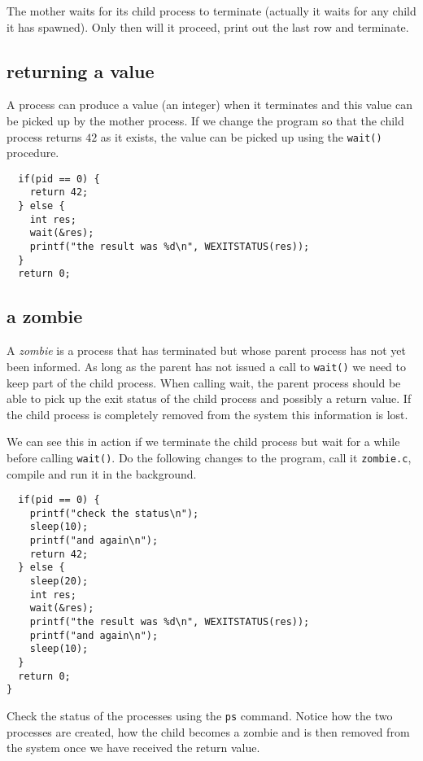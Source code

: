 \documentclass[a4paper,11pt]{article}
\begin{document}
The mother waits for its child process to terminate (actually it waits
for any child it has spawned). Only then will it proceed, print out
the last row and terminate.

\subsection{returning a value}

A process can produce a value (an integer) when it terminates and this
value can be picked up by the mother process. If we change the program
so that the child process returns $42$ as it exists, the value can be
picked up using the {\tt wait()} procedure. 

\begin{lstlisting}
  if(pid == 0) {
    return 42;
  } else {
    int res;
    wait(&res);
    printf("the result was %d\n", WEXITSTATUS(res));
  }
  return 0;
\end{lstlisting}


\subsection{a zombie}

A {\em zombie} is a process that has terminated but whose parent
process has not yet been informed. As long as the parent has not
issued a call to {\tt wait()} we need to keep part of the child
process. When calling wait, the parent process should be able to pick
up the exit status of the child process and possibly a return
value. If the child process is completely removed from the system this
information is lost.

We can see this in action if we terminate the child process but wait
for a while before calling {\tt wait()}. Do the following changes to
the program, call it {\tt zombie.c}, compile and run it in the background.

\begin{lstlisting}
  if(pid == 0) {
    printf("check the status\n");
    sleep(10);
    printf("and again\n");
    return 42;
  } else {
    sleep(20);
    int res;
    wait(&res);
    printf("the result was %d\n", WEXITSTATUS(res));
    printf("and again\n");
    sleep(10);
  }
  return 0;
}
\end{lstlisting}

Check the status of the processes using
the {\tt ps} command. Notice how the two processes are created, how the
child becomes a zombie and is then removed from the system once we
have received the return value. 
\end{document}
